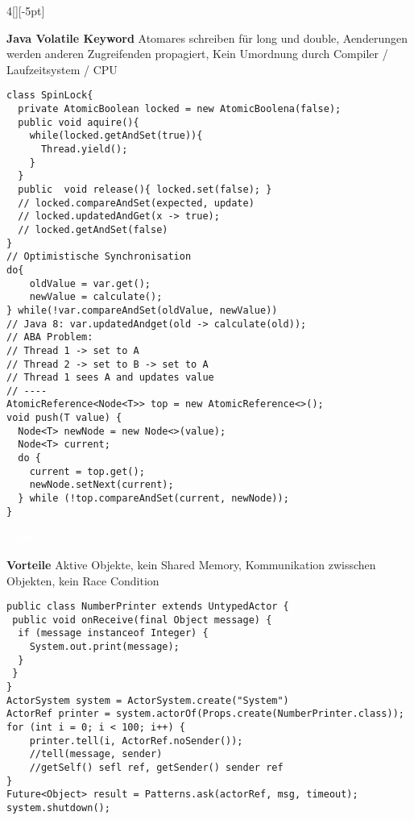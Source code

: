 \documentclass[%
	pdftex,%
	a4paper,%
	landscape,%
	ngerman,
	oneside,%
	6pt,%
	halfparskip,%
]{scrbook}
\newenvironment{mainbox}{%
  \def\FrameCommand{\fboxrule 1px \fcolorbox{black}{spec_blue}}%
  \MakeFramed {\advance\hsize-\width \FrameRestore}}%
 {\endMakeFramed}
\newcommand{\maintopic}[1]{\setcounter{subtopicenum}{0}\setcounter{subsubtopicenum}{0}\vspace{-4px}\begin{mainbox}\textcolor{white}{\textbf{\large{\stepcounter{maintopicenum}\Roman{maintopicenum}. #1}}}\end{mainbox}\vspace{-4px}}
\newenvironment{tight-itemize}
{ \begin{itemize}
    \setlength{\itemsep}{0px}
    \setlength{\parskip}{0px}
    \setlength{\parsep}{0px}  }
{ \end{itemize}                  }
\begin{document}
\begin{multicols}{4}[][-5pt]
\begin{tight-itemize}
    \item{\textbf{Java Volatile Keyword} Atomares schreiben für long und double, Aenderungen werden anderen Zugreifenden propagiert, Kein Umordnung durch Compiler / Laufzeitsystem / CPU}
\end{tight-itemize}
\begin{lstlisting}
class SpinLock{
  private AtomicBoolean locked = new AtomicBoolena(false);
  public void aquire(){
    while(locked.getAndSet(true)){
      Thread.yield();
    }
  }
  public  void release(){ locked.set(false); }
  // locked.compareAndSet(expected, update)
  // locked.updatedAndGet(x -> true);
  // locked.getAndSet(false)
}
// Optimistische Synchronisation
do{
    oldValue = var.get();
    newValue = calculate();
} while(!var.compareAndSet(oldValue, newValue))
// Java 8: var.updatedAndget(old -> calculate(old));
// ABA Problem:
// Thread 1 -> set to A
// Thread 2 -> set to B -> set to A
// Thread 1 sees A and updates value
// ----
AtomicReference<Node<T>> top = new AtomicReference<>();
void push(T value) {
  Node<T> newNode = new Node<>(value);
  Node<T> current;
  do {
    current = top.get();
    newNode.setNext(current);
  } while (!top.compareAndSet(current, newNode));
}
\end{lstlisting}
\maintopic{Actor}
\begin{tight-itemize}
	\item{\textbf{Vorteile} Aktive Objekte, kein Shared Memory, Kommunikation zwisschen Objekten, kein Race Condition}
\end{tight-itemize}
\begin{lstlisting}
public class NumberPrinter extends UntypedActor {
 public void onReceive(final Object message) {
  if (message instanceof Integer) {
    System.out.print(message);
  }
 }
}
ActorSystem system = ActorSystem.create("System")
ActorRef printer = system.actorOf(Props.create(NumberPrinter.class));
for (int i = 0; i < 100; i++) {
    printer.tell(i, ActorRef.noSender());
    //tell(message, sender)
    //getSelf() sefl ref, getSender() sender ref
}
Future<Object> result = Patterns.ask(actorRef, msg, timeout);
system.shutdown();
\end{lstlisting}


\end{multicols}
\end{document}
